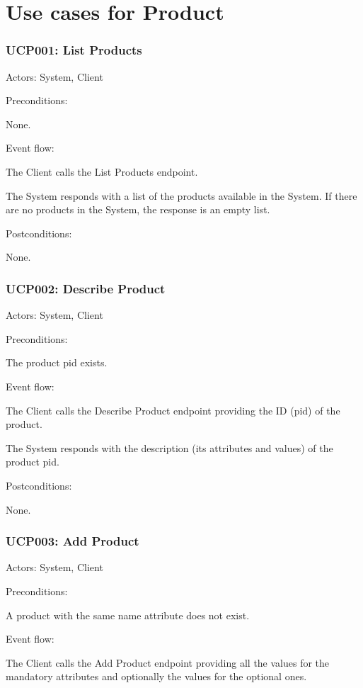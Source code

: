 \section{Use cases for Product}

\subsubsection{UCP001: List Products}
\label{UCP001}

Actors: System, Client

Preconditions: 

\ucitem None.

Event flow:

\ucitem The Client calls the List Products endpoint.

\ucitem The System responds with a list of the products available in the System. If there are no products in the System, the response is an empty list.

Postconditions: 

\ucitem None.

\subsubsection{UCP002: Describe Product}
\label{UCP002}

Actors: System, Client

Preconditions: 

\ucitem The product pid exists.

Event flow:

\ucitem The Client calls the Describe Product endpoint providing the ID (pid) of the product.

\ucitem The System responds with the description (its attributes and values) of the product pid.

Postconditions:

\ucitem None.

\subsubsection{UCP003: Add Product}
\label{UCP003}

Actors: System, Client

Preconditions: 

\ucitem A product with the same name attribute does not exist.

Event flow:

\ucitem The Client calls the Add Product endpoint providing all the values for the mandatory attributes and optionally the values for the optional ones.

